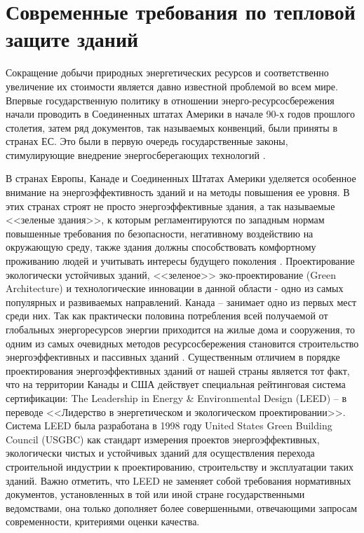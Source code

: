 \section{Современные требования по тепловой защите зданий}


Сокращение добычи природных энергетических ресурсов и соответственно увеличение их стоимости является давно известной проблемой во всем мире.
Впервые государственную политику в отношении энерго-ресурсосбережения начали проводить в Соединенных штатах Америки в начале 90-х годов прошлого столетия,
затем ряд документов, так называемых конвенций, были приняты в странах ЕС.
Это были в первую очередь государственные законы, стимулирующие внедрение энергосберегающих технологий \Code{[1, 2]}. 

В странах Европы, Канаде и Соединенных Штатах Америки уделяется особенное внимание на энергоэффективность зданий и на методы повышения ее уровня.
В этих странах строят не просто энергоэффективные здания, а так называемые <<зеленые здания>>, к которым регламентируются по западным нормам повышенные требования по безопасности,
негативному воздействию на окружающую среду, также здания должны способствовать комфортному проживанию людей и учитывать интересы будущего поколения \Code{[3]}.
Проектирование экологически устойчивых зданий, <<зеленое>> эко-проектирование (Green Architecture) \Code{[4]} и технологические инновации в данной области - одно из самых популярных и
развиваемых направлений. Канада – занимает одно из первых мест среди них. Так как практически половина потребления всей получаемой от глобальных энергоресурсов энергии
приходится на жилые дома и сооружения, то одним из самых очевидных методов ресурсосбережения становится строительство энергоэффективных и пассивных	зданий \Code{[5]}. 
Существенным отличием в порядке проектирования энергоэффективных зданий от нашей страны является тот факт, что на территории Канады и США действует
специальная рейтинговая система сертификации: The Leadership in Energy \& Environmental Design (LEED) \Code{[6]} – в переводе <<Лидерство в энергетическом и экологическом проектировании>>.
Система LEED была разработана в 1998 году United States Green Building Council (USGBC) как стандарт измерения проектов энергоэффективных,
экологически чистых и устойчивых зданий для осуществления перехода строительной индустрии к проектированию, строительству и эксплуатации таких зданий.
Важно отметить, что LEED не заменяет собой требования нормативных документов, установленных в той или иной стране государственными ведомствами,
она только дополняет более совершенными, отвечающими запросам современности, критериями оценки качества.

